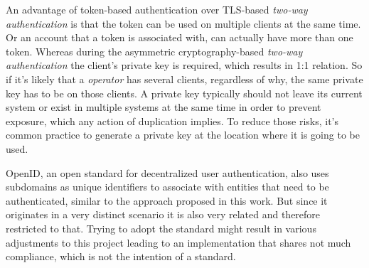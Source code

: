 \documentclass[12pt,english,a4paper,titlepage,cleardoublepage=empty,dottedtoc]{report}
\begin{document}
An advantage of token-based authentication over TLS-based \emph{two-way
authentication} is that the token can be used on multiple clients at the
same time. Or an account that a token is associated with, can actually
have more than one token. Whereas during the asymmetric
cryptography-based \emph{two-way authentication} the client's private
key is required, which results in 1:1 relation. So if it's likely that a
\emph{operator} has several clients, regardless of why, the same private
key has to be on those clients. A private key typically should not leave
its current system or exist in multiple systems at the same time in
order to prevent exposure, which any action of duplication implies. To
reduce those risks, it's common practice to generate a private key at
the location where it is going to be used.

OpenID, an open standard for decentralized user authentication, also
uses subdomains as unique identifiers to associate with entities that
need to be authenticated, similar to the approach proposed in this work.
But since it originates in a very distinct scenario it is also very
related and therefore restricted to that. Trying to adopt the standard
might result in various adjustments to this project leading to an
implementation that shares not much compliance, which is not the
intention of a standard.
\end{document}
